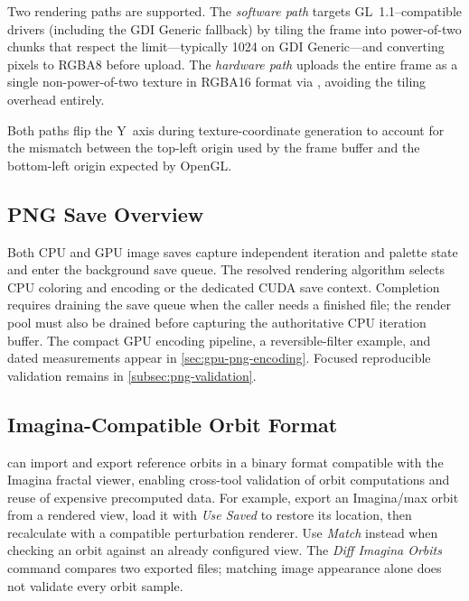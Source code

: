 Two rendering paths are supported.  The \emph{software path} targets
GL~1.1--compatible drivers (including the GDI Generic fallback) by tiling
the frame into power-of-two chunks that respect the
 limit---typically 1024 on GDI Generic---and
converting  pixels to RGBA8 before upload.  The
\emph{hardware path} uploads the entire frame as a single
non-power-of-two texture in RGBA16 format via ,
avoiding the tiling overhead entirely.

Both paths flip the Y~axis during texture-coordinate generation to
account for the mismatch between the top-left origin used by the
frame buffer and the bottom-left origin expected by OpenGL.

\subsection{PNG Save Overview}
\label{subsec:png-save-overview}

Both CPU and GPU image saves capture independent iteration and palette state
and enter the background save queue. The resolved rendering algorithm selects
CPU coloring and encoding or the dedicated CUDA save context. Completion
requires draining the save queue when the caller needs a finished file; the
render pool must also be drained before capturing the authoritative CPU
iteration buffer. The compact GPU encoding pipeline, a reversible-filter
example, and dated measurements appear in \cref{sec:gpu-png-encoding}.
Focused reproducible validation remains in \cref{subsec:png-validation}.

\subsection{Imagina-Compatible Orbit Format}
\label{subsec:imagina-format}

\FractalShark{} can import and export reference orbits in a binary format
compatible with the Imagina fractal viewer, enabling cross-tool validation of
orbit computations and reuse of expensive precomputed data. For example,
export an Imagina/max orbit from a rendered view, load it with \emph{Use Saved}
to restore its location, then recalculate with a compatible perturbation
renderer. Use \emph{Match} instead when checking an orbit against an already
configured view. The \emph{Diff Imagina Orbits} command compares two exported
files; matching image appearance alone does not validate every orbit sample.

